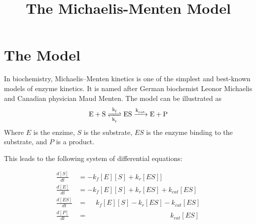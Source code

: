 \documentclass{article}
\begin{document}







\title{\large \sf The Michaelis-Menten Model}

\section{The Model}
In biochemistry, Michaelis–Menten kinetics is one of the simplest and
best-known models of enzyme kinetics. It is named after German biochemist
Leonor Michaelis and Canadian physician Maud Menten. 
The model can be illustrated as
\[
\ce{
E + S <=>C[k_f][k_r] ES ->C[k_{cat}] E + P
}
\]
Where $E$ is the enzime, $S$ is the substrate, $ES$ is the enzyme binding to
the substrate, and $P$ is a product.

This leads to the following system of differential equations:

\begin{align}
	\frac{d[S]}{dt} & = -k_f [E] [S] + k_r [ES] ]
	\label{dSdt}
	\\
	\frac{d[E]}{dt} & = -k_f [E] [S] + k_r [ES] + k_{cat} [ES]
	\label{dEdt}
	\\
	\frac{d[ES]}{dt} & = \phantom{-}k_f [E] [S] - k_r [ES] - k_{cat} [ES]
	\label{dESdt}
	\\
	\frac{d[P]}{dt} & = \phantom{-k_f [E] [S] + k_r [ES] + \;} k_{cat} [ES]
	\label{dPdt}
	\\
\end{align}
\end{document}

